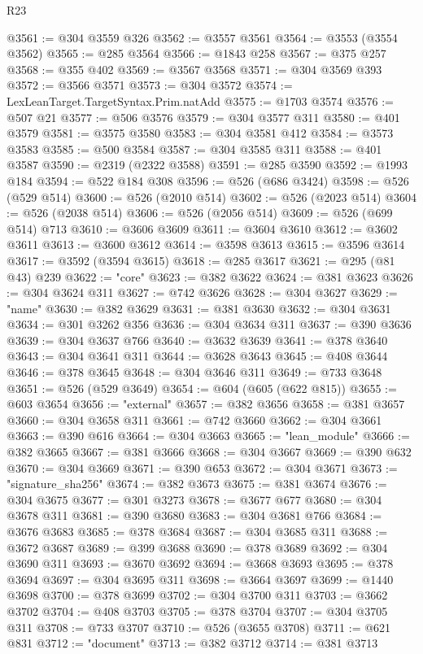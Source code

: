 \begin{lexlean}{R23}
\begin{coremodule}
@3561 := @304 @3559 @326
@3562 := @3557 @3561
@3564 := @3553 (@3554 @3562)
@3565 := @285 @3564
@3566 := @1843 @258
@3567 := @375 @257
@3568 := @355 @402
@3569 := @3567 @3568
@3571 := @304 @3569 @393
@3572 := @3566 @3571
@3573 := @304 @3572
@3574 := LexLeanTarget.TargetSyntax.Prim.natAdd
@3575 := @1703 @3574
@3576 := @507 @21
@3577 := @506 @3576
@3579 := @304 @3577 @311
@3580 := @401 @3579
@3581 := @3575 @3580
@3583 := @304 @3581 @412
@3584 := @3573 @3583
@3585 := @500 @3584
@3587 := @304 @3585 @311
@3588 := @401 @3587
@3590 := @2319 (@2322 @3588)
@3591 := @285 @3590
@3592 := @1993 @184
@3594 := @522 @184 @308
@3596 := @526 (@686 @3424)
@3598 := @526 (@529 @514)
@3600 := @526 (@2010 @514)
@3602 := @526 (@2023 @514)
@3604 := @526 (@2038 @514)
@3606 := @526 (@2056 @514)
@3609 := @526 (@699 @514) @713
@3610 := @3606 @3609
@3611 := @3604 @3610
@3612 := @3602 @3611
@3613 := @3600 @3612
@3614 := @3598 @3613
@3615 := @3596 @3614
@3617 := @3592 (@3594 @3615)
@3618 := @285 @3617
@3621 := @295 (@81 @43) @239
@3622 := "core"
@3623 := @382 @3622
@3624 := @381 @3623
@3626 := @304 @3624 @311
@3627 := @742 @3626
@3628 := @304 @3627
@3629 := "name"
@3630 := @382 @3629
@3631 := @381 @3630
@3632 := @304 @3631
@3634 := @301 @3262 @356
@3636 := @304 @3634 @311
@3637 := @390 @3636
@3639 := @304 @3637 @766
@3640 := @3632 @3639
@3641 := @378 @3640
@3643 := @304 @3641 @311
@3644 := @3628 @3643
@3645 := @408 @3644
@3646 := @378 @3645
@3648 := @304 @3646 @311
@3649 := @733 @3648
@3651 := @526 (@529 @3649)
@3654 := @604 (@605 (@622 @815))
@3655 := @603 @3654
@3656 := "external"
@3657 := @382 @3656
@3658 := @381 @3657
@3660 := @304 @3658 @311
@3661 := @742 @3660
@3662 := @304 @3661
@3663 := @390 @616
@3664 := @304 @3663
@3665 := "lean_module"
@3666 := @382 @3665
@3667 := @381 @3666
@3668 := @304 @3667
@3669 := @390 @632
@3670 := @304 @3669
@3671 := @390 @653
@3672 := @304 @3671
@3673 := "signature_sha256"
@3674 := @382 @3673
@3675 := @381 @3674
@3676 := @304 @3675
@3677 := @301 @3273
@3678 := @3677 @677
@3680 := @304 @3678 @311
@3681 := @390 @3680
@3683 := @304 @3681 @766
@3684 := @3676 @3683
@3685 := @378 @3684
@3687 := @304 @3685 @311
@3688 := @3672 @3687
@3689 := @399 @3688
@3690 := @378 @3689
@3692 := @304 @3690 @311
@3693 := @3670 @3692
@3694 := @3668 @3693
@3695 := @378 @3694
@3697 := @304 @3695 @311
@3698 := @3664 @3697
@3699 := @1440 @3698
@3700 := @378 @3699
@3702 := @304 @3700 @311
@3703 := @3662 @3702
@3704 := @408 @3703
@3705 := @378 @3704
@3707 := @304 @3705 @311
@3708 := @733 @3707
@3710 := @526 (@3655 @3708)
@3711 := @621 @831
@3712 := "document"
@3713 := @382 @3712
@3714 := @381 @3713

\end{coremodule}
\end{lexlean}

